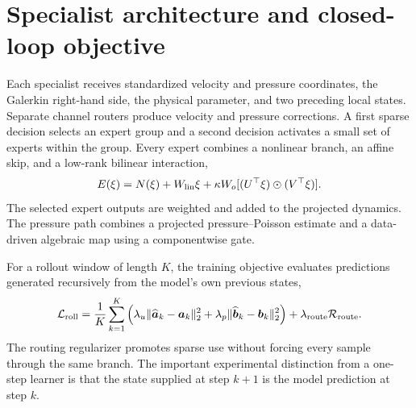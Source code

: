 \section{Specialist architecture and closed-loop objective}
\label{app:specialists}

Each specialist receives standardized velocity and pressure coordinates, the Galerkin right-hand side, the physical parameter, and two preceding local states. Separate channel routers produce velocity and pressure corrections. A first sparse decision selects an expert group and a second decision activates a small set of experts within the group. Every expert combines a nonlinear branch, an affine skip, and a low-rank bilinear interaction,
\begin{equation}
 E(\xi)=N(\xi)+W_{\rm lin}\xi+\kappa W_o[(U^\top\xi)\odot(V^\top\xi)].
\end{equation}
The selected expert outputs are weighted and added to the projected dynamics. The pressure path combines a projected pressure--Poisson estimate and a data-driven algebraic map using a componentwise gate.

For a rollout window of length $K$, the training objective evaluates predictions generated recursively from the model's own previous states,
\begin{equation}
 \mathcal L_{\rm roll}=\frac{1}{K}\sum_{k=1}^{K}
 \left(\lambda_u\|\widehat{\bm a}_k-\bm a_k\|_2^2+
       \lambda_p\|\widehat{\bm b}_k-\bm b_k\|_2^2\right)
 +\lambda_{\rm route}\mathcal R_{\rm route}.
\end{equation}
The routing regularizer promotes sparse use without forcing every sample through the same branch. The important experimental distinction from a one-step learner is that the state supplied at step $k+1$ is the model prediction at step $k$.

